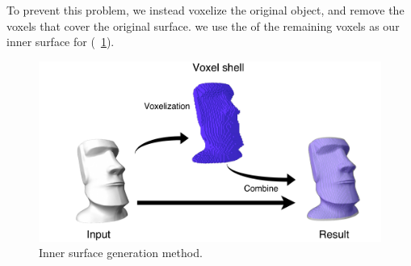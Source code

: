 To prevent this problem, we instead voxelize the original object, and remove the voxels that cover the original surface.
 we use the  of the remaining voxels as our inner surface for  (\figname~\ref{fig:inner_surface}).

\begin{figure}[ht]
\centering
\includegraphics[width=1.0\linewidth]{figs/inner2.pdf} 
\caption{Inner surface generation method.}
\label{fig:inner_surface}
\end{figure}


